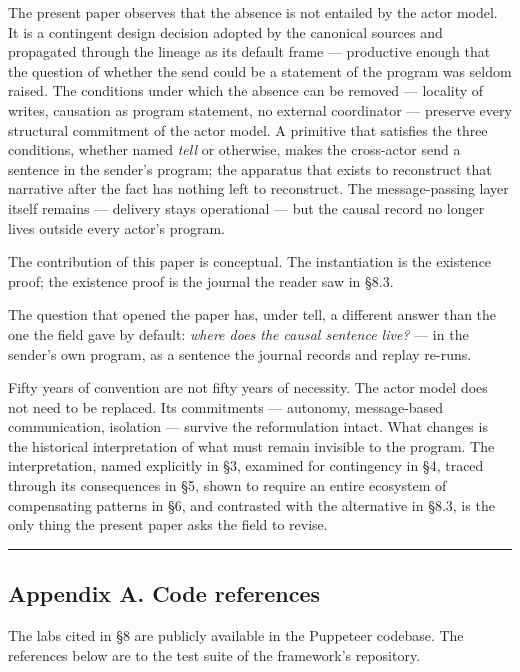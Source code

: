 \documentclass[
]{article}
\begin{document}
The present paper observes that the absence is not entailed by the actor
model. It is a contingent design decision adopted by the canonical
sources and propagated through the lineage as its default frame ---
productive enough that the question of whether the send could be a
statement of the program was seldom raised. The conditions under which
the absence can be removed --- locality of writes, causation as program
statement, no external coordinator --- preserve every structural
commitment of the actor model. A primitive that satisfies the three
conditions, whether named \emph{tell} or otherwise, makes the
cross-actor send a sentence in the sender's program; the apparatus that
exists to reconstruct that narrative after the fact has nothing left to
reconstruct. The message-passing layer itself remains --- delivery stays
operational --- but the causal record no longer lives outside every
actor's program.

The contribution of this paper is conceptual. The instantiation is the
existence proof; the existence proof is the journal the reader saw in
§8.3.

The question that opened the paper has, under tell, a different answer
than the one the field gave by default: \emph{where does the causal
sentence live?} --- in the sender's own program, as a sentence the
journal records and replay re-runs.

Fifty years of convention are not fifty years of necessity. The actor
model does not need to be replaced. Its commitments --- autonomy,
message-based communication, isolation --- survive the reformulation
intact. What changes is the historical interpretation of what must
remain invisible to the program. The interpretation, named explicitly in
§3, examined for contingency in §4, traced through its consequences in
§5, shown to require an entire ecosystem of compensating patterns in §6,
and contrasted with the alternative in §8.3, is the only thing the
present paper asks the field to revise.

\begin{center}\rule{0.5\linewidth}{0.5pt}\end{center}

\subsection{Appendix A. Code
references}\label{appendix-a.-code-references}

The labs cited in §8 are publicly available in the Puppeteer codebase.
The references below are to the test suite of the framework's
repository.
\end{document}
